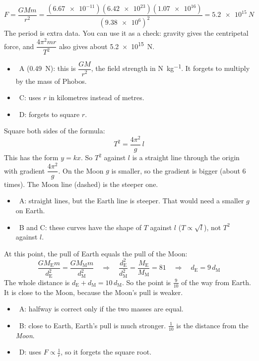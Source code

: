 \documentclass[12pt]{article}
\begin{document}
\begin{practiceanswers}
\begin{practiceans}
  \[ F = \frac{GMm}{r^2}
       = \frac{(\num{6.67e-11})(\num{6.42e23})(\num{1.07e16})}{(\num{9.38e6})^2}
       = \qty{5.2e15}{N} \]
  The period is extra data. You can use it as a check: gravity gives the centripetal force, and
  $\dfrac{4\pi^2 m r}{T^2}$ also gives about \qty{5.2e15}{N}.
  \begin{itemize}
    \item \xmark\ A (\qty{0.49}{N}): this is $\dfrac{GM}{r^2}$, the field strength in
          \si{N.kg^{-1}}. It forgets to multiply by the mass of Phobos.
    \item \xmark\ C: uses $r$ in kilometres instead of metres.
    \item \xmark\ D: forgets to square $r$.
  \end{itemize}
\end{practiceans}

\begin{practiceans}
  Square both sides of the formula:
  \[ T^2 = \frac{4\pi^2}{g}\, l \]
  This has the form $y = kx$. So $T^2$ against $l$ is a straight line through the origin with
  gradient $\dfrac{4\pi^2}{g}$. On the Moon $g$ is smaller, so the gradient is bigger (about 6
  times). The Moon line (dashed) is the steeper one.
  \begin{itemize}
    \item \xmark\ A: straight lines, but the Earth line is steeper. That would need a smaller $g$ on
          Earth.
    \item \xmark\ B and C: these curves have the shape of $T$ against $l$ ($T \propto \sqrt{l}$),
          not $T^2$ against $l$.
  \end{itemize}
\end{practiceans}

\begin{practiceans}
  At this point, the pull of Earth equals the pull of the Moon:
  \[ \frac{GM_\mathrm{E}m}{d_\mathrm{E}^2} = \frac{GM_\mathrm{M}m}{d_\mathrm{M}^2}
     \quad\Rightarrow\quad \frac{d_\mathrm{E}^2}{d_\mathrm{M}^2} = \frac{M_\mathrm{E}}{M_\mathrm{M}} = 81
     \quad\Rightarrow\quad d_\mathrm{E} = 9\,d_\mathrm{M} \]
  The whole distance is $d_\mathrm{E} + d_\mathrm{M} = 10\,d_\mathrm{M}$. So the point is
  $\frac{9}{10}$ of the way from Earth. It is close to the Moon, because the Moon's pull is weaker.
  \begin{itemize}
    \item \xmark\ A: halfway is correct only if the two masses are equal.
    \item \xmark\ B: close to Earth, Earth's pull is much stronger. $\frac{1}{10}$ is the distance
          from the \emph{Moon}.
    \item \xmark\ D: uses $F \propto \frac{1}{r}$, so it forgets the square root.
  \end{itemize}
\end{practiceans}


\end{practiceanswers}
\end{document}
